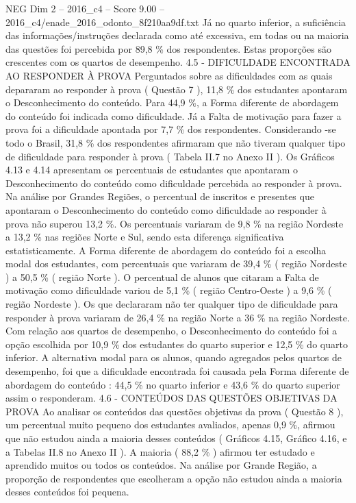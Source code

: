 \begin{textsample}{NEG Dim 2 – 2016\_c4 – Score 9.00 – 2016\_c4/enade\_2016\_odonto\_8f210aa9df.txt}
Já no quarto inferior, a suficiência das informações/instruções declarada como até excessiva, em todas ou na maioria das questões foi percebida por 89,8 \% dos respondentes.
Estas proporções são crescentes com os quartos de desempenho. 4.5 - DIFICULDADE ENCONTRADA AO RESPONDER À PROVA Perguntados sobre as dificuldades com as quais depararam ao responder à prova ( Questão 7 ), 11,8 \% dos estudantes apontaram o Desconhecimento do conteúdo.
Para 44,9 \%, a Forma diferente de abordagem do conteúdo foi indicada como dificuldade.
Já a Falta de motivação para fazer a prova foi a dificuldade apontada por 7,7 \% dos respondentes.
Considerando -se todo o Brasil, 31,8 \% dos respondentes afirmaram que não tiveram qualquer tipo de dificuldade para responder à prova ( Tabela II.7 no Anexo II ).
Os Gráficos 4.13 e 4.14 apresentam os percentuais de estudantes que apontaram o Desconhecimento do conteúdo como dificuldade percebida ao responder à prova.
Na análise por Grandes Regiões, o percentual de inscritos e presentes que apontaram o Desconhecimento do conteúdo como dificuldade ao responder à prova não superou 13,2 \%.
Os percentuais variaram de 9,8 \% na região Nordeste a 13,2 \% nas regiões Norte e Sul, sendo esta diferença significativa estatisticamente.
A Forma diferente de abordagem do conteúdo foi a escolha modal dos estudantes, com percentuais que variaram de 39,4 \% ( região Nordeste ) a 50,5 \% ( região Norte ).
O percentual de alunos que citaram a Falta de motivação como dificuldade variou de 5,1 \% ( região Centro-Oeste ) a 9,6 \% ( região Nordeste ).
Os que declararam não ter qualquer tipo de dificuldade para responder à prova variaram de 26,4 \% na região Norte a 36 \% na região Nordeste.
Com relação aos quartos de desempenho, o Desconhecimento do conteúdo foi a opção escolhida por 10,9 \% dos estudantes do quarto superior e 12,5 \% do quarto inferior.
A alternativa modal para os alunos, quando agregados pelos quartos de desempenho, foi que a dificuldade encontrada foi causada pela Forma diferente de abordagem do conteúdo : 44,5 \% no quarto inferior e 43,6 \% do quarto superior assim o responderam. 4.6 - CONTEÚDOS DAS QUESTÕES OBJETIVAS DA PROVA Ao analisar os conteúdos das questões objetivas da prova ( Questão 8 ), um percentual muito pequeno dos estudantes avaliados, apenas 0,9 \%, afirmou que não estudou ainda a maioria desses conteúdos ( Gráficos 4.15, Gráfico 4.16, e a Tabelas II.8 no Anexo II ).
A maioria ( 88,2 \% ) afirmou ter estudado e aprendido muitos ou todos os conteúdos.
Na análise por Grande Região, a proporção de respondentes que escolheram a opção não estudou ainda a maioria desses conteúdos foi pequena.

\end{textsample}
